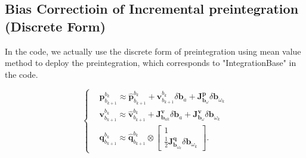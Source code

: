 \documentclass[12pt]{report}   %
\begin{document}


\subsection{Bias Correctioin of Incremental preintegration (Discrete Form)}

In the code, we actually use the discrete form of preintegration using mean value method to deploy the preintegration, 
which corresponds to "IntegrationBase" in the code.

\begin{equation}
	\left\{
	\begin{aligned}
	&\bm{p}_{b_{k+1}}^{b_k}\approx\hat{\bm{p}}_{b_{k+1}}^{b_k}+\bm{v}_{b_{k+1}}^{b_k}\delta\bm{b}_a+\bm{J}^{\bm{p}}_{\bm{b}_\omega}\delta\bm{b}_{\omega_k} \\
	&\bm{v}_{b_{k+1}}^{b_k}\approx\hat{\bm{v}}_{b_{k+1}}^{b_k}+\bm{J}^{\bm{v}}_{\bm{b}_{ak}}\delta\bm{b}_a+\bm{J}^{\bm{v}}_{\bm{b}_\omega}\delta\bm{b}_{\omega_k} \\
	&\bm{q}_{b_{k+1}}^{b_k}\approx\hat{\bm{q}}_{b_{k+1}}^{b_k}\otimes 
		\begin{bmatrix}
			1 \\ \frac{1}{2}\bm{J}^{\bm{q}}_{\bm{b}_{\omega_k}}\delta\bm{b}_{\omega_k}
		\end{bmatrix}.
	\end{aligned}
	\right.
	\label{eq.discrete}
	\end{equation}
\end{document}
